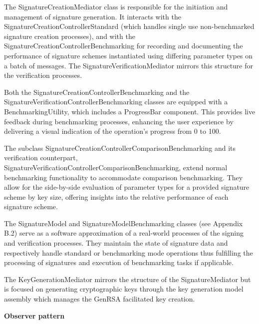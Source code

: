 \documentclass[]{final_report}
\theoremstyle{definition}
\begin{document}
The SignatureCreationMediator class is responsible for the initiation and management of signature generation. It interacts with the SignatureCreationControllerStandard (which handles single use non-benchmarked signature creation processes), and with the SignatureCreationControllerBenchmarking for recording and documenting the performance of signature schemes instantiated using differing parameter types on a batch of messages. 
The SignatureVerificationMediator mirrors this structure for the verification processes. 

Both the SignatureCreationControllerBenchmarking and the SignatureVerificationControllerBenchmarking classes are equipped with a BenchmarkingUtility, which includes a ProgressBar component. This provides live feedback during benchmarking processes, enhancing the user experience by delivering a visual indication of the operation's progress from 0 to 100.

The subclass SignatureCreationControllerComparisonBenchmarking and its verification counterpart, SignatureVerificationControllerComparisonBenchmarking, extend normal benchmarking functionality to accommodate comparison benchmarking. They allow for the side-by-side evaluation of parameter types for a provided signature scheme by key size, offering insights into the relative performance of each signature scheme.

The SignatureModel and SignatureModelBenchmarking classes (see Appendix B.2) serve as a software approximation of a real-world processes of the signing and verification processes. They maintain the state of signature data and respectively handle standard or benchmarking mode operations thus fulfilling the processing of signatures and execution of benchmarking tasks if applicable.

The KeyGenerationMediator mirrors the structure of the SignatureMediator but is focused on generating cryptographic keys through the key generation model assembly which manages the GenRSA facilitated key creation.

\textbf{Observer pattern}
\end{document}
